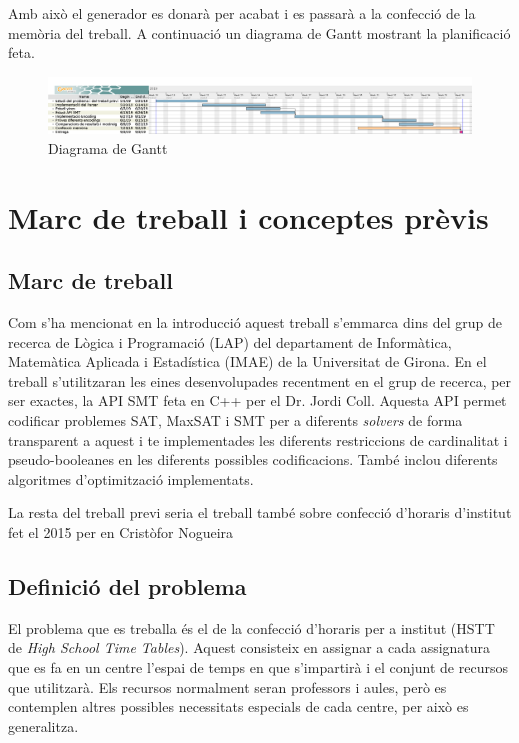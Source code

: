 \documentclass[11pt,a4paper,twoside]{report}
\begin{document}
  Amb això el generador es donarà per acabat i es passarà a la confecció de la memòria del treball. 
  A continuació un diagrama de Gantt mostrant la planificació feta.



  \begin{figure}
    \centering
    \includegraphics[angle=90,origin=c,height=0.58\textheight]{Diagrames/gantt1.png} 
    \caption{Diagrama de Gantt}
    \label{fig:Gantt}
  \end{figure}




  \chapter{Marc de treball i conceptes prèvis}
  \section{Marc de treball}
    Com s'ha mencionat en la introducció aquest treball s'emmarca dins del grup de recerca de Lògica i Programació (LAP) del departament de Informàtica, Matemàtica Aplicada i Estadística (IMAE) de la Universitat de Girona. 
    En el treball s'utilitzaran les eines desenvolupades recentment en el grup de recerca, per ser exactes, la API SMT feta en C++ per el Dr. Jordi Coll. 
    Aquesta API permet codificar problemes SAT, MaxSAT i SMT per a diferents \textit{solvers} de forma transparent a aquest i te implementades les diferents restriccions de cardinalitat i pseudo-booleanes en les diferents possibles codificacions. 
    També inclou diferents algoritmes d'optimització implementats.

    La resta del treball previ seria el treball també sobre confecció d'horaris d'institut fet el 2015 per en Cristòfor Nogueira\cite{treballCristo}

  \section{Definició del problema}
    El problema que es treballa és el de la confecció d'horaris per a institut (HSTT de \textit{High School Time Tables}). 
    Aquest consisteix en assignar a cada assignatura que es fa en un centre l'espai de temps en que s'impartirà i el conjunt de recursos que utilitzarà. 
    Els recursos normalment seran professors i aules, però es contemplen altres possibles necessitats especials de cada centre, per això es generalitza.
\end{document}

